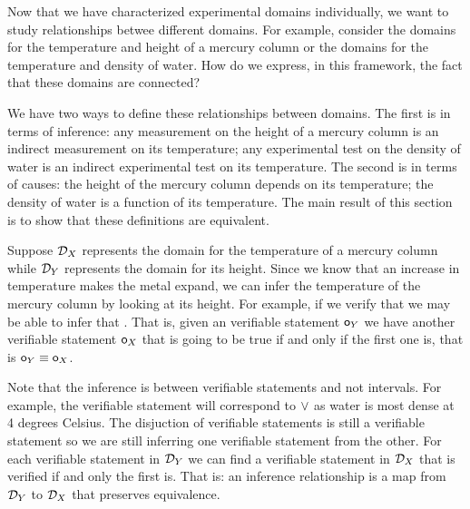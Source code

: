 \documentclass[11pt,letterpaper,fleqn]{memoir} %
\begin{document}
Now that we have characterized experimental domains individually, we want to study relationships betwee different domains. For example, consider the domains for the temperature and height of a mercury column or the domains for the temperature and density of water. How do we express, in this framework, the fact that these domains are connected?

We have two ways to define these relationships between domains. The first is in terms of inference: any measurement on the height of a mercury column is an indirect measurement on its temperature; any experimental test on the density of water is an indirect experimental test on its temperature. The second is in terms of causes: the height of the mercury column depends on its temperature; the density of water is a function of its temperature. The main result of this section is to show that these definitions are equivalent.

Suppose $\mathcal{D}_X$ represents the domain for the temperature of a mercury column while $\mathcal{D}_Y$ represents the domain for its height. Since we know that an increase in temperature makes the metal expand, we can infer the temperature of the mercury column by looking at its height. For example, if we verify that  we may be able to infer that . That is, given an verifiable statement $\mathsf{o}_Y$ we have another verifiable statement $\mathsf{o}_X$ that is going to be true if and only if the first one is, that is $\mathsf{o}_Y\equiv\mathsf{o}_X$.

Note that the inference is between verifiable statements and not intervals. For example, the verifiable statement  will correspond to $\vee$ as water is most dense at 4 degrees Celsius. The disjuction of verifiable statements is still a verifiable statement so we are still inferring one verifiable statement from the other. For each verifiable statement in $\mathcal{D}_Y$ we can find a verifiable statement in $\mathcal{D}_X$ that is verified if and only the first is. That is: an inference relationship is a map from $\mathcal{D}_Y$ to $\mathcal{D}_X$ that preserves equivalence.
\end{document}
